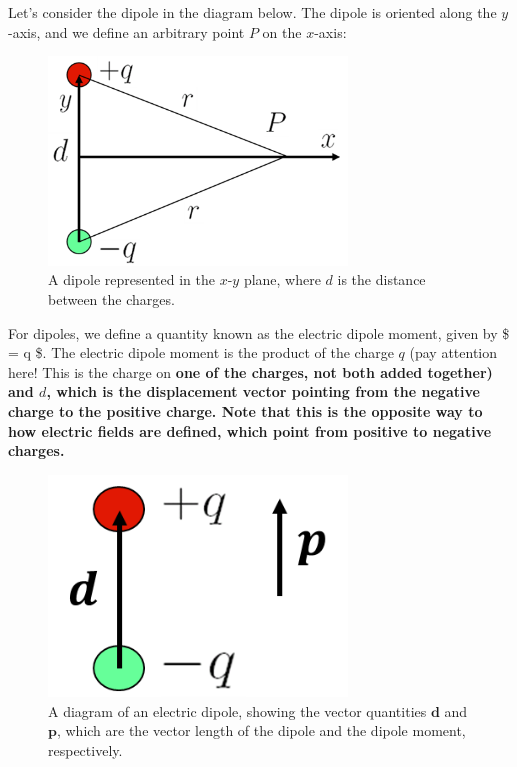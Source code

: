 \documentclass[
  letterpaper,
  DIV=11,
  numbers=noendperiod]{scrreprt}
\begin{document}
Let's consider the dipole in the diagram below. The dipole is oriented
along the \(y\)-axis, and we define an arbitrary point \(P\) on the
\(x\)-axis:

\begin{figure}[H]

{\centering \includegraphics[width=3.125in,height=\textheight]{Figures/dipole_diagram.png}

}

\caption{A dipole represented in the \(x\)-\(y\) plane, where \(d\) is
the distance between the charges.}

\end{figure}%

For dipoles, we define a quantity known as the electric dipole moment,
given by \$ = q  \$. The electric
dipole moment is the product of the charge \(q\) (pay attention here!
This is the charge on
\bf{one of} the charges, not both added together) and $d$, which is the displacement vector pointing from the negative charge to the positive charge. Note that this is the opposite way to how electric fields are defined, which point from positive to negative charges.  

\begin{figure}[H]

{\centering \includegraphics[width=3.125in,height=\textheight]{Figures/dipole_moment.png}

}

\caption{A diagram of an electric dipole, showing the vector quantities
\(\mathrm{\mathbf{d}}\) and \(\mathrm{\mathbf{p}}\), which are the
vector length of the dipole and the dipole moment, respectively.}

\end{figure}%
\end{document}
